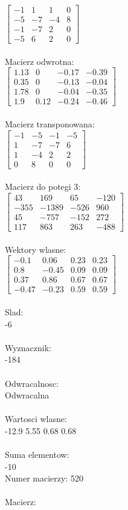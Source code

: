 \documentclass[a4paper,12pt]{article}
\begin{document}
$\begin{bmatrix} -1&1&1&0\\-5&-7&-4&8\\-1&-7&2&0\\-5&6&2&0 \end{bmatrix}$
\\
\\
Macierz odwrotna:\\

$\begin{bmatrix} 1.13&0&-0.17&-0.39\\0.35&0&-0.13&-0.04\\1.78&0&-0.04&-0.35\\1.9&0.12&-0.24&-0.46 \end{bmatrix}$
\\
\\
Macierz transponowana:\\

$\begin{bmatrix} -1&-5&-1&-5\\1&-7&-7&6\\1&-4&2&2\\0&8&0&0 \end{bmatrix}$
\\
\\
Macierz do potegi 3:\\

$\begin{bmatrix} 43&169&65&-120\\-355&-1389&-526&960\\45&-757&-152&272\\117&863&263&-488 \end{bmatrix}$
\\
\\
Wektory wlasne:\\

$\begin{bmatrix} -0.1&0.06&0.23&0.23\\0.8&-0.45&0.09&0.09\\0.37&0.86&0.67&0.67\\-0.47&-0.23&0.59&0.59 \end{bmatrix}$
\\
\\
Slad:\\
-6
\\
\\
Wyznacznik:\\
-184
\\
\\
Odwracalnosc:\\
Odwracalna
\\
\\
Wartosci wlasne:\\
-12.9 5.55 0.68 0.68
\\
\\
Suma elementow:\\
-10
\\
\newpage
Numer macierzy:
520
\\
\\
Macierz:\\
\end{document}
